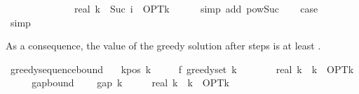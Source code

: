 \begin{isabellebody}
\ \ \ \ \ \ \ \ \ {\isasymle}\ {\isacharparenleft}{\kern0pt}{}\ {\isacharminus}{\kern0pt}\ {}\ {\isacharslash}{\kern0pt}\ real\ k{\isacharparenright}{\kern0pt}\ {\isacharcircum}{\kern0pt}\ Suc\ i\ {\isacharasterisk}{\kern0pt}\ OPT{\isacharunderscore}{\kern0pt}k{\isachardoublequoteclose}\isanewline
\ \ \ \ \isamarkupfalse%
\ {\isacharparenleft}{\kern0pt}simp\ add{\isacharcolon}{\kern0pt}\ pow{\isacharunderscore}{\kern0pt}Suc{\isacharparenright}{\kern0pt}\isanewline
\ \ \isamarkupfalse%
\ {\isacharquery}{\kern0pt}case\isanewline
\ \ \ \ \isamarkupfalse%
\ simp\isanewline
{}\isamarkupfalse%
%
\endisatagproof
{\isafoldproof}%
%
\isadelimproof
%
\endisadelimproof
%
\begin{isamarkuptext}%
As a consequence, the value of the greedy solution after  steps is
  at least .%
\end{isamarkuptext}\isamarkuptrue%
\isamarkupfalse%
\ greedy{\isacharunderscore}{\kern0pt}sequence{\isacharunderscore}{\kern0pt}bound{\isacharcolon}{\kern0pt}\isanewline
\ \ \ k{\isacharunderscore}{\kern0pt}pos{\isacharcolon}{\kern0pt}\ {\isachardoublequoteopen}k\ {\isachargreater}{\kern0pt}\ {}{\isachardoublequoteclose}\isanewline
\ \ \ {\isachardoublequoteopen}f\ {\isacharparenleft}{\kern0pt}greedy{\isacharunderscore}{\kern0pt}set\ k{\isacharparenright}{\kern0pt}\ {\isasymge}\ {\isacharparenleft}{\kern0pt}{}\ {\isacharminus}{\kern0pt}\ {\isacharparenleft}{\kern0pt}{}\ {\isacharminus}{\kern0pt}\ {}\ {\isacharslash}{\kern0pt}\ real\ k{\isacharparenright}{\kern0pt}\ {\isacharcircum}{\kern0pt}\ k{\isacharparenright}{\kern0pt}\ {\isacharasterisk}{\kern0pt}\ OPT{\isacharunderscore}{\kern0pt}k{\isachardoublequoteclose}\isanewline
%
\isadelimproof
%
\endisadelimproof
%
\isatagproof
{}\isamarkupfalse%
\ {\isacharminus}{\kern0pt}\isanewline
\ \ \isamarkupfalse%
\ gap{\isacharunderscore}{\kern0pt}bound{\isacharcolon}{\kern0pt}\isanewline
\ \ \ \ {\isachardoublequoteopen}gap\ k\ {\isasymle}\ {\isacharparenleft}{\kern0pt}{}\ {\isacharminus}{\kern0pt}\ {}\ {\isacharslash}{\kern0pt}\ real\ k{\isacharparenright}{\kern0pt}\ {\isacharcircum}{\kern0pt}\ k\ {\isacharasterisk}{\kern0pt}\ OPT{\isacharunderscore}{\kern0pt}k{\isachardoublequoteclose}\isanewline

\end{isabellebody}
